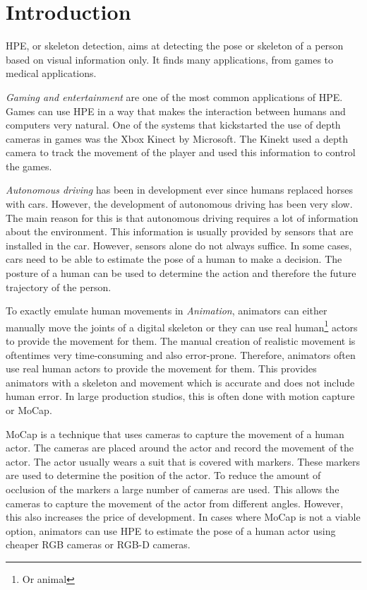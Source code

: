 \chapter{Introduction}
\setcounter{page}{1}
HPE, or skeleton detection, aims at detecting the pose or skeleton of a person based on visual information only. It finds many applications, from games to medical applications\cite{kumarapu2020animepose, ClinicalApplicationChen, MedicalAnimation}. 

\textit{Gaming and entertainment} are one of the most common applications of HPE. Games can use HPE in a way that makes the interaction between humans and computers very natural. One of the systems that kickstarted the use of depth cameras in games was the Xbox Kinect by Microsoft. The Kinekt used a depth camera to track the movement of the player and used this information to control the games.

\textit{Autonomous driving} has been in development ever since humans replaced horses with cars\cite{OldAutoDrive}. However, the development of autonomous driving has been very slow. The main reason for this is that autonomous driving requires a lot of information about the environment. This information is usually provided by sensors that are installed in the car. However, sensors alone do not always suffice. In some cases, cars need to be able to estimate the pose of a human to make a decision. The posture of a human can be used to determine the action and therefore the future trajectory of the person. 

To exactly emulate human movements in \textit{Animation}, animators can either manually move the joints of a digital skeleton or they can use real human\footnote{Or animal} actors to provide the movement for them. The manual creation of realistic movement is oftentimes very time-consuming and also error-prone. Therefore, animators often use real human actors to provide the movement for them. This provides animators with a skeleton and movement which is accurate and does not include human error. In large production studios, this is often done with motion capture or MoCap. 

MoCap is a technique that uses cameras to capture the movement of a human actor. The cameras are placed around the actor and record the movement of the actor. The actor usually wears a suit that is covered with markers. These markers are used to determine the position of the actor. To reduce the amount of occlusion of the markers a large number of cameras are used. This allows the cameras to capture the movement of the actor from different angles. However, this also increases the price of development. In cases where MoCap is not a viable option, animators can use HPE to estimate the pose of a human actor using cheaper RGB cameras or RGB-D cameras.

